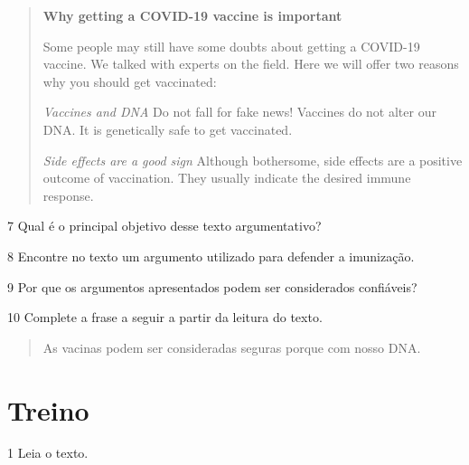 \begin{quote}
\textbf{Why getting a COVID-19 vaccine is important}

Some people may still have some doubts about getting a COVID-19 vaccine. We talked with experts on the field. Here we will offer two reasons why you should get vaccinated:

\textit{Vaccines and DNA}
Do not fall for fake news! Vaccines do not alter our DNA. It is genetically safe to get vaccinated.

\textit{Side effects are a good sign}
Although bothersome, side effects are a positive outcome of vaccination. They usually indicate the desired immune response.

\end{quote}

\num{7} Qual é o principal objetivo desse texto argumentativo?



\num{8} Encontre no texto um argumento utilizado para defender a
imunização.



\num{9} Por que os argumentos apresentados podem ser considerados
confiáveis?



\num{10} Complete a frase a seguir a partir da leitura do texto.

\begin{quote}
As vacinas podem ser consideradas seguras porque  com nosso DNA.
\end{quote}

\section{Treino}

\num{1} Leia o texto.

